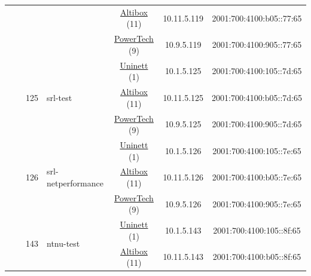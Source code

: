 \begin{small}
\begin{center}
\begin{longtable}{|c|c|c|c|c|c|c|c|}
  &  &  &  & \multicolumn{2}{|c|}{\tiny{\href{https://www.altibox.no}{Altibox} (11)}} & \tiny{10.11.5.119} & \tiny{2001:700:4100:b05::77:65} \\* \cline{5-5}\cline{6-6}\cline{7-7}\cline{8-8}
  &  &  &  & \multicolumn{2}{|c|}{\tiny{\href{http://www.powertech.no}{PowerTech} (9)}} & \tiny{10.9.5.119} & \tiny{2001:700:4100:905::77:65} \\* \cline{3-3}\cline{4-4}\cline{5-5}\cline{6-6}\cline{7-7}\cline{8-8}
  &  & \multirow{3}{*}{\tiny{125}} & \multicolumn{1}{|l|}{\multirow{3}{*}{\tiny{srl-test}}} & \multicolumn{2}{|c|}{\tiny{\href{https://www.uninett.no}{Uninett} (1)}} & \tiny{10.1.5.125} & \tiny{2001:700:4100:105::7d:65} \\* \cline{5-5}\cline{6-6}\cline{7-7}\cline{8-8}
  &  &  &  & \multicolumn{2}{|c|}{\tiny{\href{https://www.altibox.no}{Altibox} (11)}} & \tiny{10.11.5.125} & \tiny{2001:700:4100:b05::7d:65} \\* \cline{5-5}\cline{6-6}\cline{7-7}\cline{8-8}
  &  &  &  & \multicolumn{2}{|c|}{\tiny{\href{http://www.powertech.no}{PowerTech} (9)}} & \tiny{10.9.5.125} & \tiny{2001:700:4100:905::7d:65} \\* \cline{3-3}\cline{4-4}\cline{5-5}\cline{6-6}\cline{7-7}\cline{8-8}
  &  & \multirow{3}{*}{\tiny{126}} & \multicolumn{1}{|l|}{\multirow{3}{*}{\tiny{srl-netperformance}}} & \multicolumn{2}{|c|}{\tiny{\href{https://www.uninett.no}{Uninett} (1)}} & \tiny{10.1.5.126} & \tiny{2001:700:4100:105::7e:65} \\* \cline{5-5}\cline{6-6}\cline{7-7}\cline{8-8}
  &  &  &  & \multicolumn{2}{|c|}{\tiny{\href{https://www.altibox.no}{Altibox} (11)}} & \tiny{10.11.5.126} & \tiny{2001:700:4100:b05::7e:65} \\* \cline{5-5}\cline{6-6}\cline{7-7}\cline{8-8}
  &  &  &  & \multicolumn{2}{|c|}{\tiny{\href{http://www.powertech.no}{PowerTech} (9)}} & \tiny{10.9.5.126} & \tiny{2001:700:4100:905::7e:65} \\* \cline{3-3}\cline{4-4}\cline{5-5}\cline{6-6}\cline{7-7}\cline{8-8}
  &  & \multirow{3}{*}{\tiny{143}} & \multicolumn{1}{|l|}{\multirow{3}{*}{\tiny{ntnu-test}}} & \multicolumn{2}{|c|}{\tiny{\href{https://www.uninett.no}{Uninett} (1)}} & \tiny{10.1.5.143} & \tiny{2001:700:4100:105::8f:65} \\* \cline{5-5}\cline{6-6}\cline{7-7}\cline{8-8}
  &  &  &  & \multicolumn{2}{|c|}{\tiny{\href{https://www.altibox.no}{Altibox} (11)}} & \tiny{10.11.5.143} & \tiny{2001:700:4100:b05::8f:65} \\* \cline{5-5}\cline{6-6}\cline{7-7}\cline{8-8}

\end{longtable}
\end{center}
\end{small}
